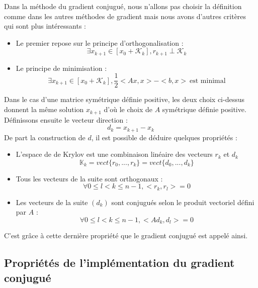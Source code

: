 Dans la méthode du gradient conjugué, nous n'allons pas choisir la définition comme dans les autres méthodes de gradient mais nous avons d'autres critères qui sont plus intéressants : 
\begin{itemize}
	\item Le premier repose sur le principe d'orthogonalisation : 
	\begin{equation}
		\exists x_{k+1} \in [x_0 + \mathcal{K}_k], r_{k+1} \perp \mathcal{K}_k
	\end{equation}
	\item Le principe de minimisation : 
	\begin{equation}
		\exists x_{k+1} \in [x_0 + \mathcal{K}_k], \frac{1}{2}<Ax, x> - <b, x> \ \text{est minimal}
	\end{equation}
\end{itemize}
Dans le cas d'une matrice symétrique définie positive, les deux choix ci-dessus donnent la même solution $x_{k+1}$ d'où le choix de $A$ symétrique définie positive. \\
Définissons ensuite le vecteur direction : 
\begin{equation}
d_k = x_{k+1} - x_k
\end{equation}
De part la construction de $d$, il  est possible de déduire quelques propriétés : 
\begin{itemize}
	\item L'espace de de Krylov est une combinaison linéaire des vecteurs $r_k$ et $d_k$
	\begin{equation}
	\mathbb{K}_k = vect\{r_0, ..., r_k\} = vect\{d_0, ..., d_k\}
	\end{equation}
	\item Tous les vecteurs de la suite sont orthogonaux : 
	\begin{equation}
		\forall 0 \leq l < k \leq n - 1, <r_k, r_l> = 0
	\end{equation}
	\item Les vecteurs de la suite $(d_k)$ sont conjugués selon le produit vectoriel défini par $A$ : 
	\begin{equation}
		\forall 0 \leq l < k \leq n - 1, <Ad_k, d_l> = 0
	\end{equation}
\end{itemize}
C'est grâce à cette dernière propriété que le gradient conjugué est appelé ainsi.
\subsection{Propriétés de l'implémentation du gradient conjugué}

